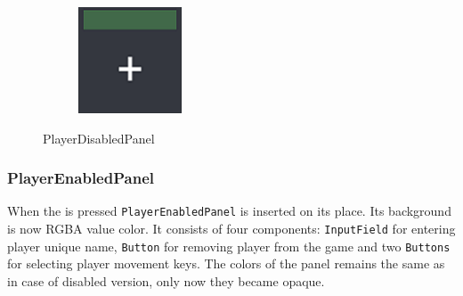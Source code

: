 \begin{figure}[h]
\begin{subfigure}{0.1975\textwidth}
	\end{subfigure}
	\begin{subfigure}{0.1975\textwidth}
		\centering
		\includegraphics[scale=1, frame]{gui-imgs/player6disabledpanel}
	\end{subfigure}
	\caption{PlayerDisabledPanel}
\end{figure}

\subsubsection*{PlayerEnabledPanel}\label{gui-playerenabledpanel}
\noindent When the  is pressed \verb+PlayerEnabledPanel+ is inserted on its place. Its background is now  RGBA value color. It consists of four components: \verb+InputField+ for entering player unique name, \verb+Button+ for removing player from the game and two \verb+Buttons+ for selecting player movement keys. The colors of the panel remains the same as in case of disabled version, only now they became opaque.

